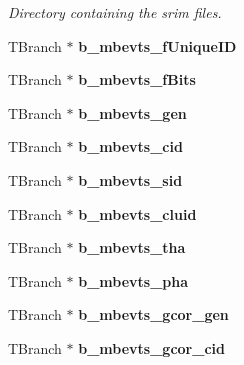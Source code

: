 \begin{DoxyCompactItemize}
\begin{DoxyCompactList}\small\item\em Directory containing the srim files. \end{DoxyCompactList}\item 
\hypertarget{classg__clx_ada0e05bae03e42e14c8e8494122a1709}{T\-Branch $\ast$ {\bfseries b\-\_\-mbevts\-\_\-f\-Unique\-I\-D}}\label{classg__clx_ada0e05bae03e42e14c8e8494122a1709}

\item 
\hypertarget{classg__clx_ad19ba31973ff37f5351edf88f4dbf5aa}{T\-Branch $\ast$ {\bfseries b\-\_\-mbevts\-\_\-f\-Bits}}\label{classg__clx_ad19ba31973ff37f5351edf88f4dbf5aa}

\item 
\hypertarget{classg__clx_abfc7aed653b54224fb7ae61efd081de6}{T\-Branch $\ast$ {\bfseries b\-\_\-mbevts\-\_\-gen}}\label{classg__clx_abfc7aed653b54224fb7ae61efd081de6}

\item 
\hypertarget{classg__clx_a4b7eebd7443d5a9058d4c21aca44e6bc}{T\-Branch $\ast$ {\bfseries b\-\_\-mbevts\-\_\-cid}}\label{classg__clx_a4b7eebd7443d5a9058d4c21aca44e6bc}

\item 
\hypertarget{classg__clx_a80f356c60fe1eea5e82fcba16b4d482b}{T\-Branch $\ast$ {\bfseries b\-\_\-mbevts\-\_\-sid}}\label{classg__clx_a80f356c60fe1eea5e82fcba16b4d482b}

\item 
\hypertarget{classg__clx_ae91752a1092e7b3ec6191515378fbd63}{T\-Branch $\ast$ {\bfseries b\-\_\-mbevts\-\_\-cluid}}\label{classg__clx_ae91752a1092e7b3ec6191515378fbd63}

\item 
\hypertarget{classg__clx_a7c4dd347f0cf1856c3aaca6c77a3280a}{T\-Branch $\ast$ {\bfseries b\-\_\-mbevts\-\_\-tha}}\label{classg__clx_a7c4dd347f0cf1856c3aaca6c77a3280a}

\item 
\hypertarget{classg__clx_ae9e6b4ef1483c136f08a0bd34ff3c98a}{T\-Branch $\ast$ {\bfseries b\-\_\-mbevts\-\_\-pha}}\label{classg__clx_ae9e6b4ef1483c136f08a0bd34ff3c98a}

\item 
\hypertarget{classg__clx_a272e88232977ef4a5537d35dea2abb53}{T\-Branch $\ast$ {\bfseries b\-\_\-mbevts\-\_\-gcor\-\_\-gen}}\label{classg__clx_a272e88232977ef4a5537d35dea2abb53}

\item 
\hypertarget{classg__clx_a3fd25e2237b246bfea4505b3df5f18f6}{T\-Branch $\ast$ {\bfseries b\-\_\-mbevts\-\_\-gcor\-\_\-cid}}\label{classg__clx_a3fd25e2237b246bfea4505b3df5f18f6}


\end{DoxyCompactItemize}
